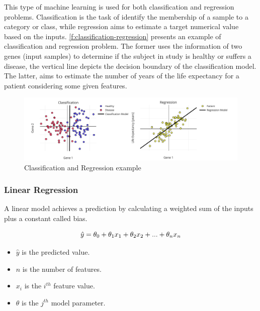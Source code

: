 This type of machine learning is used for both classification and regression problems. Classification is the task of identify the membership of a sample to a category or class, while regression aims to estimate a target numerical value based on the inputs. \autoref{f:classification-regression} presents an example of classification and regression problem. The former uses the information of two genes (input samples) to determine if the subject in study is healthy or suffers a disease, the vertical line depicts the decision boundary of the classification model. The latter, aims to estimate the number of years of the life expectancy for a patient considering some given features. 

\begin{figure}[h]
\centering
\includegraphics[width=\linewidth]{figures/Ch2/Regression-Classification.png}
\caption{Classification and Regression example}
\label{f:classification-regression}
\end{figure}

\subsubsection{Linear Regression}
A linear model achieves a prediction by calculating a weighted sum of the inputs plus a constant called bias.

\begin{equation}
    \hat{y} = \theta_0 + \theta_1 x_1 + \theta_2 x_2 + ...+ \theta_n x_n\\
\end{equation}

\begin{itemize}
    \item \begin{math}\hat{y}\end{math} is the predicted value.
    \item \begin{math}n\end{math} is the number of features.
    \item \begin{math}x_i\end{math} is the \begin{math}i^{th}\end{math} feature value.
    \item \begin{math}\theta\end{math} is the \begin{math}j^{th}\end{math} model parameter.
\end{itemize}

